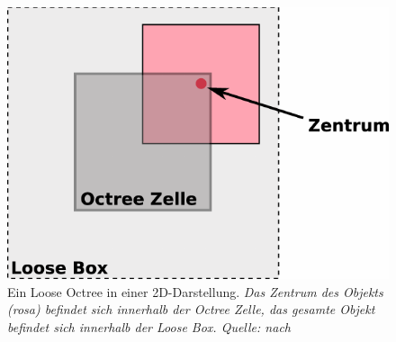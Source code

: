 \begin{figure}
 \centering
  \includegraphics[scale=0.8]{images/looseoctree2.pdf}
  \caption{Ein Loose Octree in einer 2D-Darstellung. \textit{Das Zentrum des Objekts (rosa) befindet sich innerhalb der Octree Zelle, das gesamte Objekt befindet sich innerhalb der Loose Box. Quelle: nach \cite{anteru}}}
 \label{fig:basics:looseoctree}
\end{figure}

